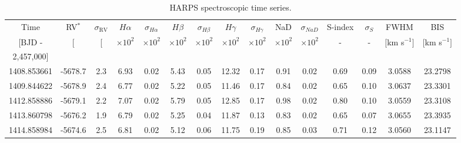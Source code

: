 \begin{table*}[t]
\caption{HARPS spectroscopic time series.}
\label{tab:timeseries}
\centering
\small
\begin{tabular}{ccccccccccccccc}
\hline\noalign{\smallskip}
Time & RV$^{*}$ & $\sigma_{\text{RV}}$ & $H\alpha$ & $\sigma_{H\alpha}$ & $H\beta$ & $\sigma_{H\beta}$ & $H\gamma$ & $\sigma_{H\gamma}$ & NaD & $\sigma_{NaD}$ & S-index & $\sigma_{S}$ & FWHM & BIS \\ 
$[$BJD - & [\mps{]} & [\mps{]} & $\times 10^2$ & $\times 10^2$ & $\times 10^2$ & $\times 10^2$ & $\times 10^2$ & $\times 10^2$ & $\times 10^2$ & $\times 10^2$ & - & - & $[$km s$^{-1}]$ & $[$km s$^{-1}]$ \\ 
2,457,000$]$ &&&&&&&&&&&&&& \\ 
\hline\noalign{\smallskip}
1408.853661 & -5678.7 & 2.3 & 6.93 & 0.02 & 5.43 & 0.05 & 12.32 & 0.17 & 0.91 & 0.02 & 0.69 & 0.09 & 3.0588 & 23.2798 \\ 
1409.844622 & -5678.9 & 2.4 & 6.77 & 0.02 & 5.22 & 0.05 & 11.46 & 0.17 & 0.84 & 0.02 & 0.65 & 0.10 & 3.0637 & 23.3301 \\ 
1412.858886 & -5679.1 & 2.2 & 7.07 & 0.02 & 5.79 & 0.05 & 12.85 & 0.17 & 0.98 & 0.02 & 0.80 & 0.10 & 3.0559 & 23.3108 \\ 
1413.860798 & -5676.2 & 1.9 & 6.79 & 0.02 & 5.25 & 0.04 & 11.87 & 0.13 & 0.83 & 0.02 & 0.65 & 0.07 & 3.0655 & 23.3935 \\ 
1414.858984 & -5674.6 & 2.5 & 6.81 & 0.02 & 5.12 & 0.06 & 11.75 & 0.19 & 0.85 & 0.03 & 0.71 & 0.12 & 3.0560 & 23.1147 \\ 

\end{tabular}
\end{table*}
